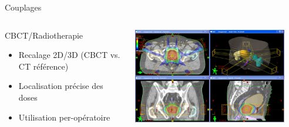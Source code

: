 \documentclass{beamer}
\begin{document}
\begin{frame}{Couplages}
 \centering
  \begin{columns}[T]
 \begin{column}{0.5\textwidth}
\begin{block}{CBCT/Radiotherapie}
\begin{itemize}
 \item Recalage 2D/3D (CBCT vs. CT référence)
 \item Localisation précise des doses
 \item Utilisation per-opératoire
\end{itemize}
\end{block}
 \end{column}
 \begin{column}{0.5\textwidth}
\includegraphics[width=0.9\textwidth]{images/cbct_radio.jpg}
\end{column}
\end{columns}
\end{frame}
\end{document}
